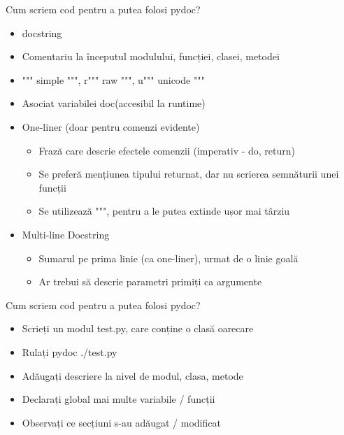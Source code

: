 \documentclass{beamer}
\begin{document}
\begin{frame}{Cum scriem cod pentru a putea folosi pydoc?}
  \begin{itemize}
    \item docstring
    \pause
    \item Comentariu la începutul modulului, funcției, clasei, metodei
    \pause
    \item """ simple """, r""" raw """, u""" unicode """
    \pause
    \item Asociat variabilei \textunderscore\textunderscore
    doc\textunderscore\textunderscore  (accesibil la runtime)
    \pause
    \item One-liner (doar pentru comenzi evidente)
    \pause
      \begin{itemize}
        \item Frază care descrie efectele comenzii (imperativ - do, return)
        \pause
        \item Se preferă mențiunea tipului returnat, dar nu scrierea
        semnăturii unei funcții
        \pause
        \item Se utilizează """, pentru a le putea extinde ușor mai târziu
      \end{itemize}
    \item Multi-line Docstring
      \pause
      \begin{itemize}
        \item Sumarul pe prima linie (ca one-liner), urmat de o linie goală
        \pause
      \item Ar trebui să descrie parametri primiți ca argumente
      \end{itemize}
  \end{itemize}
\end{frame}

\begin{frame}{Cum scriem cod pentru a putea folosi pydoc?}
  \begin{itemize}
    \item Scrieți un modul test.py, care conține o clasă oarecare
    \item Rulați pydoc ./test.py
    \item Adăugați descriere la nivel de modul, clasa, metode
    \item Declarați global mai multe variabile / funcții
    \item Observați ce secțiuni s-au adăugat / modificat
  \end{itemize}
\end{frame}
\end{document}
